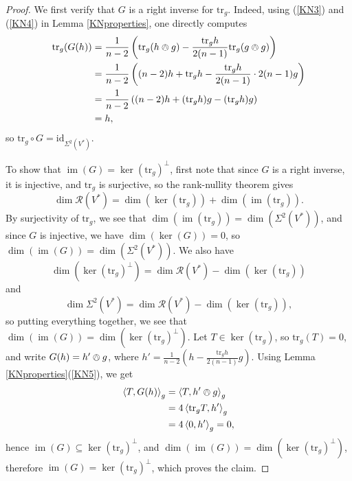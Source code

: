 \documentclass{amsart}
\numberwithin{equation}{section}
\def\~#1{\mathscr{#1}}
\newcommand{\im}{\mathop{\mathrm{im}}}
\newcommand{\tr}{\mathrm{tr}}
\newcommand{\id}{\mathrm{id}}
\newcommand{\law}{\left\langle}
\newcommand{\raw}{\right\rangle}
\theoremstyle{plain}
\theoremstyle{definition}
\theoremstyle{remark}
\begin{document}
\begin{proof}
    We first verify that $G$ is a right inverse for $\tr_g$. Indeed, using (\ref{KN3}) and (\ref{KN4}) in Lemma \ref{KNproperties}, one directly computes
    \begin{align*}
        \tr_g(G(h)) &= \frac{1}{n-2}\left(\tr_g(h \owedge g) - \frac{\tr_g h}{2(n-1)}\tr_g(g \owedge g)\right)\\
        &=  \frac{1}{n-2}\left((n-2)h + \tr_g h - \frac{ \tr_g h}{2(n-1)}\cdot 2(n-1)g\right) \\
        &= \frac{1}{n-2}\left((n-2)h + (\tr_g h)g - (\tr_g h)g \right)\\
        &= h,
    \end{align*}
    so $\tr_g \circ G = \id_{\Sigma^2(V^*)}$.

    To show that $\im(G) = \ker(\tr_g)^\perp$, first note that since $G$ is a right inverse, it is injective, and  $\tr_g$ is surjective, so the rank-nullity theorem gives
    \[\dim \~R(V^*) = \dim\left(\ker(\tr_g)\right) + \dim\left(\im(\tr_g)\right).\]
    By surjectivity of $\tr_g$, we see that $\dim\left(\im(\tr_g)\right) = \dim \left(\Sigma^2(V^*)\right)$, and since $G$ is injective, we have $\dim(\ker(G)) = 0$, so $\dim(\im(G)) = \dim(\Sigma^2(V^*))$. We also have
    \[\dim(\ker(\tr_g)^\perp) = \dim \~R(V^*) - \dim(\ker(\tr_g))\]
    and
    \[\dim \Sigma^2(V^*) = \dim \~R(V^*) - \dim \left(\ker(\tr_g)\right),\]
    so putting everything together, we see that $\dim(\im(G))= \dim(\ker(\tr_g)^\perp)$. Let $T \in \ker(\tr_g)$, so $\tr_g(T) = 0$, and write $G(h) = h' \owedge g$, where $h'= \frac{1}{n-2}\left(h - \frac{\tr_g h}{2(n-1)}g\right)$. Using Lemma \ref{KNproperties}(\ref{KN5}), we get 
    \begin{align*}
    \law T, G(h) \raw_g &= \law T, h' \owedge g \raw_g\\
     &= 4\law \tr_g T, h' \raw_g \\
     &= 4\law 0, h' \raw_g = 0,
    \end{align*}
    hence $\im(G) \subseteq \ker(\tr_g)^\perp$, and $\dim(\im(G)) = \dim(\ker(\tr_g)^\perp)$, therefore $\im(G) = \ker(\tr_g)^\perp$, which proves the claim.
\end{proof}
\end{document}
